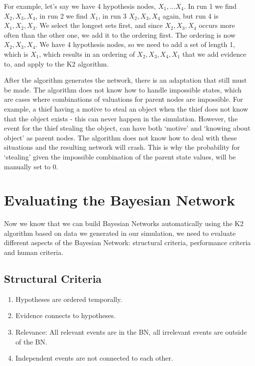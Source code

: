 For example, let's say we have 4 hypothesis nodes, $X_1,...X_4$. In run 1 we find $X_2, X_3, X_4$, in run 2 we find $X_1$, in run 3 $X_2, X_3, X_4$ again, but run 4 is $X_1, X_2, X_3$. We select the longest sets first, and since $X_2, X_3, X_4$ occurs more often than the other one, we add it to the ordering first.  The ordering is now $X_2, X_3, X_4$. We have 4 hypothesis nodes, so we need to add a set of length 1, which is $X_1$, which results in an ordering of $X_2, X_3, X_4, X_1$ that we add evidence to, and apply to the K2 algorithm.

After the algorithm generates the network, there is an adaptation that still must be made. The algorithm does not know how to handle impossible states, which are cases where combinations of valuations for parent nodes are impossible. For example, a thief having a motive to steal an object when the thief does not know that the object exists - this can never happen in the simulation. However, the event for the thief stealing the object, can have both `motive' and `knowing about object' as parent nodes. The algorithm does not know how to deal with these situations and the resulting network will crash. This is why the probability for `stealing' given the impossible combination of the parent state values, will be manually set to 0. 


\section{Evaluating the Bayesian Network}

Now we know that we can build Bayesian Networks automatically using the K2 algorithm based on data we generated in our simulation, we need to evaluate different aspects of the Bayesian Network: structural criteria, performance criteria and human criteria.

\subsection{Structural Criteria}
\begin{enumerate}
\item Hypotheses are ordered temporally. 
\item Evidence connects to hypotheses.
\item Relevance: All relevant events are in the BN, all irrelevant events are outside of the BN.
\item Independent events are not connected to each other.
\end{enumerate}

